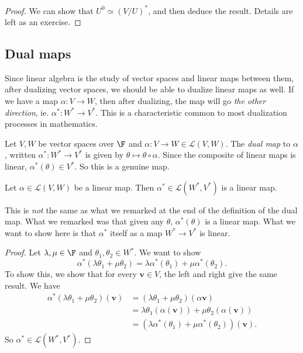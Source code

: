 \documentclass[a4paper]{article}
\begin{document}
\begin{proof}
  We can show that $U^0 \simeq (V/U)^*$, and then deduce the result. Details are left as an exercise.
\end{proof}

\subsection{Dual maps}
Since linear algebra is the study of vector spaces and linear maps between them, after dualizing vector spaces, we should be able to dualize linear maps as well. If we have a map $\alpha: V \to W$, then after dualizing, the map will go \emph{the other direction}, ie. $\alpha^*: W^* \to V^*$. This is a characteristic common to most dualization processes in mathematics.

\begin{defi}
  Let $V, W$ be vector spaces over $\F$ and $\alpha: V\to W \in \mathcal{L}(V, W)$. The \emph{dual map} to $\alpha$, written $\alpha^*: W^* \to V^*$ is given by $\theta \mapsto \theta \circ \alpha$. Since the composite of linear maps is linear, $\alpha^*(\theta) \in V^*$. So this is a genuine map.
\end{defi}

\begin{prop}
  Let $\alpha \in \mathcal{L}(V, W)$ be a linear map. Then $\alpha^* \in \mathcal{L}(W^*, V^*)$ is a linear map.
\end{prop}
This is \emph{not} the same as what we remarked at the end of the definition of the dual map. What we remarked was that given any $\theta$, $\alpha^*(\theta)$ is a linear map. What we want to show here is that $\alpha^*$ itself as a map $W^* \to V^*$ is linear.

\begin{proof}
  Let $\lambda, \mu \in \F$ and $\theta_1, \theta_2 \in W^*$. We want to show
  \[
    \alpha^*(\lambda \theta_1 + \mu \theta_2) = \lambda \alpha^*(\theta_1) + \mu \alpha^*(\theta_2).
  \]
  To show this, we show that for every $\mathbf{v} \in V$, the left and right give the same result. We have
  \begin{align*}
    \alpha^*(\lambda \theta_1 + \mu \theta_2)(\mathbf{v}) &= (\lambda \theta_1 + \mu \theta_2)(\alpha \mathbf{v}) \\
    &= \lambda \theta_1 (\alpha (\mathbf{v})) + \mu \theta_2 (\alpha(\mathbf{v})) \\
    &= (\lambda \alpha^*(\theta_1)+ \mu \alpha^*(\theta_2))(\mathbf{v}).
  \end{align*}
  So $\alpha^* \in \mathcal{L}(W^*, V^*)$.
\end{proof}
\end{document}
